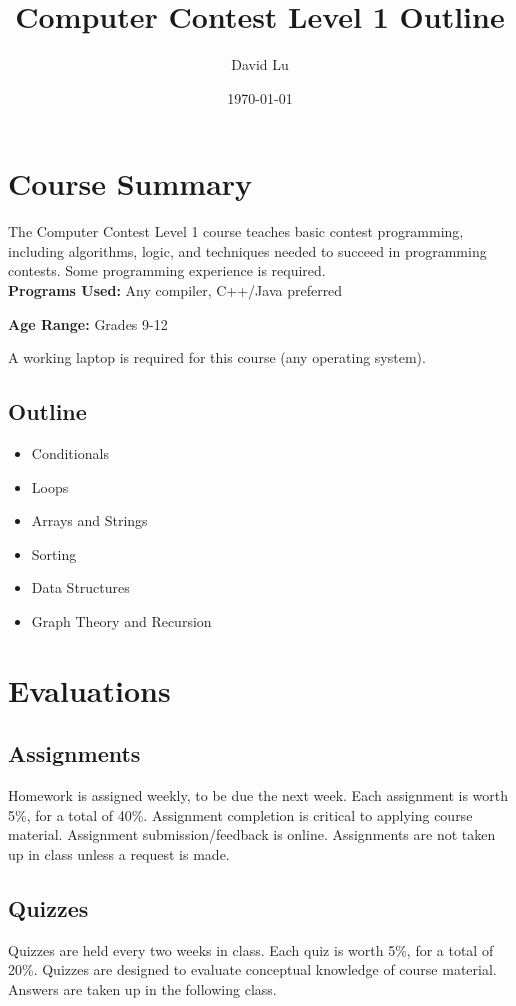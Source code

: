 \documentclass{article}
\begin{document}
	\title{Computer Contest Level 1 Outline}
	\date{\today}
	\author{David Lu}
	\maketitle
	
	\section{Course Summary}
	The Computer Contest Level 1 course teaches basic contest programming, including algorithms, logic, and techniques needed to succeed in programming contests. Some programming experience is required.\\
	
	\textbf{Programs Used:} Any compiler, C++/Java preferred 
	
	\textbf{Age Range:} Grades 9-12
	
	A working laptop is required for this course (any operating system).
	
	\subsection{Outline}
	\begin{itemize}
		\item{Conditionals}
		\item{Loops}
		\item{Arrays and Strings}
		\item{Sorting}
		\item{Data Structures}
		\item{Graph Theory and Recursion}
	\end{itemize}
	
	\section{Evaluations}
	
	\subsection{Assignments}
	Homework is assigned weekly, to be due the next week. Each assignment is worth 5\%, for a total of 40\%. Assignment completion is critical to applying course material. Assignment submission/feedback is online. Assignments are not taken up in class unless a request is made. 
	
	\subsection{Quizzes}
	Quizzes are held every two weeks in class. Each quiz is worth 5\%, for a total of 20\%. Quizzes are designed to evaluate conceptual knowledge of course material. Answers are taken up in the following class.
	
\end{document}
